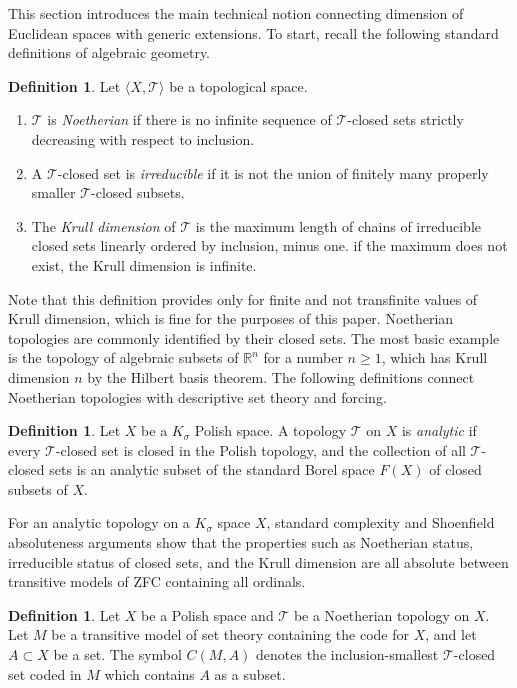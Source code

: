 \documentclass{article}
\newcommand{\gs}{\sigma}
\theoremstyle{definition}
\newtheorem{definition}[theorem]{Definition}
\begin{document}
This section introduces the main technical notion connecting dimension of Euclidean spaces with generic extensions. To start, recall the following standard definitions of algebraic geometry.

\begin{definition}
Let $\langle X, \mathcal{T}\rangle$ be a topological space.

\begin{enumerate}
\item $\mathcal{T}$ is \emph{Noetherian} if there is no infinite sequence of $\mathcal{T}$-closed sets strictly decreasing with respect to inclusion.
\item  A $\mathcal{T}$-closed set is \emph{irreducible} if it is not the union of finitely many properly smaller $\mathcal{T}$-closed subsets.
\item The \emph{Krull dimension} of $\mathcal{T}$ is the maximum length of chains of irreducible closed sets linearly ordered by inclusion, minus one. if the maximum does not exist, the Krull dimension is infinite.
\end{enumerate}
\end{definition}

\noindent Note that this definition provides only for finite and not transfinite values of Krull dimension, which is fine for the purposes of this paper. Noetherian topologies are commonly identified by their closed sets. The most basic example is the topology of algebraic subsets of $\mathbb{R}^n$ for a number $n\geq 1$, which has Krull dimension $n$ by the Hilbert basis theorem. The following definitions connect Noetherian topologies with descriptive set theory and forcing.

\begin{definition}
Let $X$ be a $K_\gs$ Polish space. A topology $\mathcal{T}$ on $X$ is \emph{analytic} if every $\mathcal{T}$-closed set is closed in the Polish topology, and the collection of all $\mathcal{T}$-closed sets is an analytic subset of the standard Borel space $F(X)$ of closed subsets of $X$.
\end{definition}

\noindent For an analytic topology on a $K_\gs$ space $X$, standard complexity and Shoenfield absoluteness arguments show that the properties such as Noetherian status, irreducible status of closed sets, and the Krull dimension are all absolute between transitive models of ZFC containing all ordinals.

\begin{definition}
Let $X$ be a Polish space and $\mathcal{T}$ be a Noetherian topology on $X$. Let $M$ be a transitive model of set theory containing the code for $X$, and let $A\subset X$ be a set. The symbol $C(M, A)$ denotes the inclusion-smallest $\mathcal{T}$-closed set coded in $M$ which contains $A$ as a subset.
\end{definition}
\end{document}
